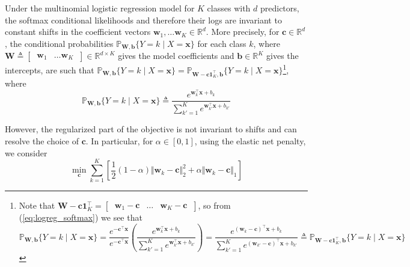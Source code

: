 \documentclass{article}
\numberwithin{equation}{section}
\begin{document}
Under the multinomial logistic regression model for $ K $ classes with $ d $
predictors, the softmax conditional likelihoods and therefore their logs are
invariant to constant shifts in the coefficient vectors
$ \mathbf{w}_1, \ldots \mathbf{w}_K \in \mathbb{R}^d $. More precisely, for
$ \mathbf{c} \in \mathbb{R}^d $, the conditional probabilities
$ \mathbb{P}_{\mathbf{W}, \mathbf{b}}\{Y = k \mid X = \mathbf{x}\} $ for each
class $ k $, where $ \mathbf{W} \triangleq \begin{bmatrix} \ \mathbf{w}_1 &
\ldots \mathbf{w}_K \ \end{bmatrix} \in \mathbb{R}^{d \times K} $ gives the
model coefficients and $ \mathbf{b} \in \mathbb{R}^K $ gives the intercepts,
are such that $ \mathbb{P}_{\mathbf{W}, \mathbf{b}}\{Y = k \mid
X = \mathbf{x}\} = \mathbb{P}_{\mathbf{W} - \mathbf{c}\mathbf{1}_K^\top,
\mathbf{b}}\{Y = k \mid X = \mathbf{x}\} $\footnote{
    Note that $ \mathbf{W} - \mathbf{c1}_K^\top = \begin{bmatrix}
        \ \mathbf{w}_1 - \mathbf{c} & \ldots & \mathbf{w}_K - \mathbf{c} \
    \end{bmatrix} $, so from (\ref{eq:logreg_softmax}) we see that
    \begin{equation*}
        \mathbb{P}_{\mathbf{W}, \mathbf{b}}\{
            Y = k \mid X = \mathbf{x}
        \} =
        \frac{e^{-\mathbf{c}^\top\mathbf{x}}}{e^{-\mathbf{c}^\top\mathbf{x}}}
        \left(
            \frac{
                e^{\mathbf{w}_k^\top\mathbf{x} + b_k}
            }{
                \sum_{k' = 1}^Ke^{\mathbf{w}_{k'}^\top\mathbf{x} + b_{k'}}
            }
        \right) =
        \frac{
            e^{(\mathbf{w}_k - \mathbf{c})^\top\mathbf{x} + b_k}
        }{
            \sum_{k' = 1}^K
            e^{(\mathbf{w}_{k'} - \mathbf{c})^\top\mathbf{x} + b_{k'}}
        } \triangleq
        \mathbb{P}_{\mathbf{W} - \mathbf{c1}_K^\top, \mathbf{b}}\{
            Y = k \mid X = \mathbf{x}
        \}
    \end{equation*}
}, where
\begin{equation} \label{eq:logreg_softmax}
    \mathbb{P}_{\mathbf{W}, \mathbf{b}}\{Y = k \mid X = \mathbf{x}\} \triangleq
    \frac{
        e^{\mathbf{w}_k^\top\mathbf{x} + b_k}
    }{
        \sum_{k' = 1}^Ke^{\mathbf{w}_{k'}^\top\mathbf{x} + b_{k'}}
    }
\end{equation}

However, the regularized part of the objective is not invariant to shifts and
can resolve the choice of $ \mathbf{c} $. In particular, for
$ \alpha \in [0, 1] $, using the elastic net penalty, we consider
\begin{equation} \label{eq:3.3.1}
    \min_\mathbf{c}\sum_{k = 1}^K\left[
        \frac{1}{2}(1 - \alpha)\Vert\mathbf{w}_k - \mathbf{c}\Vert_2^2 +
        \alpha\Vert\mathbf{w}_k - \mathbf{c}\Vert_1
    \right]
\end{equation}
\end{document}
